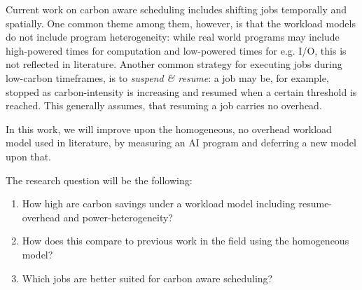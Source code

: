 Current work on carbon aware scheduling includes shifting jobs temporally and spatially. 
One common theme among them, however, is that the workload models do not include program heterogeneity: while real world programs may include high-powered times for computation and low-powered times for e.g. I/O, this is not reflected in literature. 
Another common strategy for executing jobs during low-carbon timeframes, is to \emph{suspend \& resume}: a job may be, for example, stopped as carbon-intensity is increasing and resumed when a certain threshold is reached. 
This generally assumes, that resuming a job carries no overhead. 

In this work, we will improve upon the homogeneous, no overhead workload model used in literature, by measuring an AI program and deferring a new model upon that.

The research question will be the following:

\begin{enumerate}
    \item How high are carbon savings under a workload model including resume-overhead and power-heterogeneity?
    \item How does this compare to previous work in the field using the homogeneous model?
    \item Which jobs are better suited for carbon aware scheduling?
\end{enumerate}
